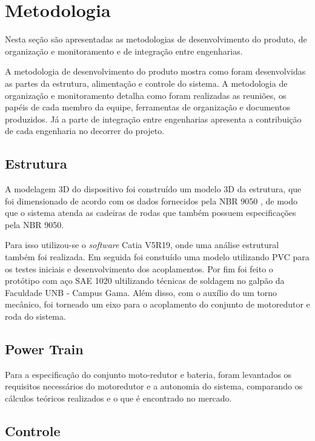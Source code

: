 \chapter[Metodologia]{Metodologia}

Nesta seção são apresentadas as metodologias de desenvolvimento do produto, de organização e monitoramento e de integração entre engenharias.

A metodologia de desenvolvimento do produto mostra como foram desenvolvidas as partes da estrutura, alimentação e controle do sistema. A metodologia de organização e monitoramento detalha como foram realizadas as reuniões, os papéis de cada membro da equipe, ferramentas de organização e documentos produzidos. Já a parte de integração entre engenharias apresenta a contribuição de cada engenharia no decorrer do projeto.

\section{Estrutura}

A modelagem 3D do dispositivo foi construído um modelo 3D da estrutura, que foi dimensionado de acordo com os dados fornecidos pela NBR 9050 \cite{nbr9050}, de modo que o sistema atenda as cadeiras de rodas que também possuem especificações pela NBR 9050.

Para isso utilizou-se o \textit{software} Catia V5R19, onde uma análise estrutural também foi realizada. Em seguida foi constuído uma modelo utilizando PVC para os testes iniciais e desenvolvimento dos acoplamentos. Por fim foi feito o protótipo com aço SAE 1020 ultilizando técnicas de soldagem no galpão da Faculdade UNB - Campus Gama. Além disso, com o auxílio do um torno mecânico, foi torneado um eixo para o acoplamento do conjunto de motoredutor e roda do sistema.

\section{Power Train}

Para a especificação do conjunto moto-redutor e bateria, foram levantados os requisitos necessários do motoredutor e a autonomia do sistema, comparando os cálculos teóricos realizados e o que é encontrado no mercado.

\section{Controle}

